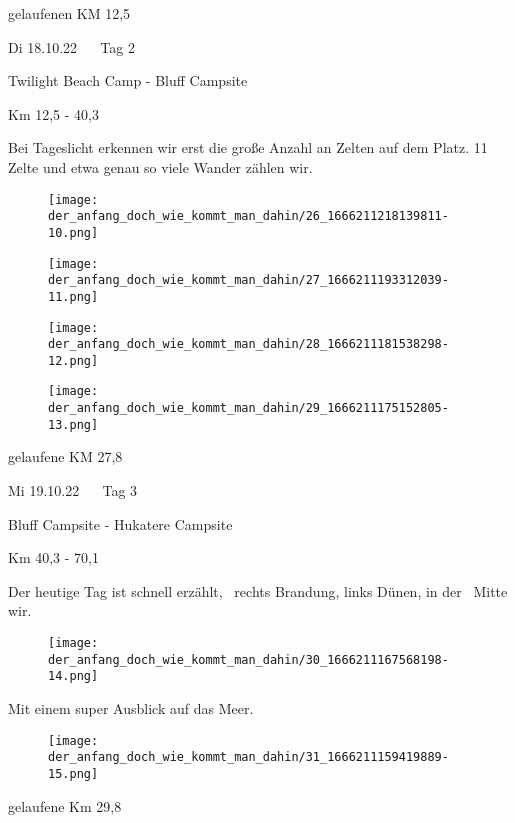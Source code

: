   gelaufenen KM 12,5
 


   Di 18.10.22    Tag 2
  


   Twilight Beach Camp - Bluff Campsite
  


  Km 12,5 - 40,3
 


  Bei Tageslicht erkennen wir erst die große Anzahl an Zelten auf dem Platz. 11 Zelte und etwa genau so viele Wander zählen wir.
 


\begin{figure}[H]
	\centering
	\texttt{[image: der\_anfang\_doch\_wie\_kommt\_man\_dahin/26\_1666211218139811-10.png]}
	\caption{}
	\label{fig:26_1666211218139811-10}
\end{figure}

\begin{figure}[H]
	\centering
	\texttt{[image: der\_anfang\_doch\_wie\_kommt\_man\_dahin/27\_1666211193312039-11.png]}
	\caption{}
	\label{fig:27_1666211193312039-11}
\end{figure}

\begin{figure}[H]
	\centering
	\texttt{[image: der\_anfang\_doch\_wie\_kommt\_man\_dahin/28\_1666211181538298-12.png]}
	\caption{}
	\label{fig:28_1666211181538298-12}
\end{figure}

\begin{figure}[H]
	\centering
	\texttt{[image: der\_anfang\_doch\_wie\_kommt\_man\_dahin/29\_1666211175152805-13.png]}
	\caption{}
	\label{fig:29_1666211175152805-13}
\end{figure}

  gelaufene KM 27,8
 


    Mi 19.10.22    Tag 3
   


    Bluff Campsite - Hukatere Campsite
   


   Km 40,3 - 70,1
  


  Der heutige Tag ist schnell erzählt,  rechts Brandung, links Dünen, in der  Mitte wir.
 


\begin{figure}[H]
	\centering
	\texttt{[image: der\_anfang\_doch\_wie\_kommt\_man\_dahin/30\_1666211167568198-14.png]}
	\caption{}
	\label{fig:30_1666211167568198-14}
\end{figure}

  Mit einem super Ausblick auf das Meer.
 


\begin{figure}[H]
	\centering
	\texttt{[image: der\_anfang\_doch\_wie\_kommt\_man\_dahin/31\_1666211159419889-15.png]}
	\caption{}
	\label{fig:31_1666211159419889-15}
\end{figure}

  gelaufene Km 29,8
 


